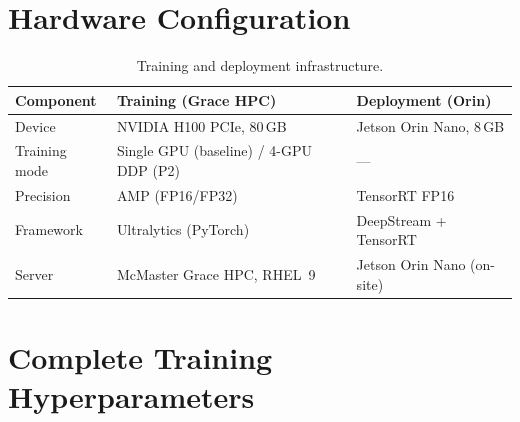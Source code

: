 \documentclass[12pt, titlepage]{article}
\begin{document}




\newpage
\appendix

\section{Hardware Configuration}
\label{app:hardware}

\begin{table}[H]
  \centering
  \caption{Training and deployment infrastructure.}
  \label{tab:hardware}
  \begin{tabular}{@{}lll@{}}
    \toprule
    \textbf{Component} & \textbf{Training (Grace HPC)}          & \textbf{Deployment (Orin)} \\
    \midrule
    Device             & NVIDIA H100 PCIe, 80\,GB               & Jetson Orin Nano, 8\,GB    \\
    Training mode      & Single GPU (baseline) / 4-GPU DDP (P2) & ---                        \\
    Precision          & AMP (FP16/FP32)                        & TensorRT FP16              \\
    Framework          & Ultralytics (PyTorch)                  & DeepStream + TensorRT      \\
    \midrule
    Server             & McMaster Grace HPC, RHEL~9             & Jetson Orin Nano (on-site) \\
    \bottomrule
  \end{tabular}
\end{table}

\section{Complete Training Hyperparameters}
\label{app:hyperparams}
\end{document}

